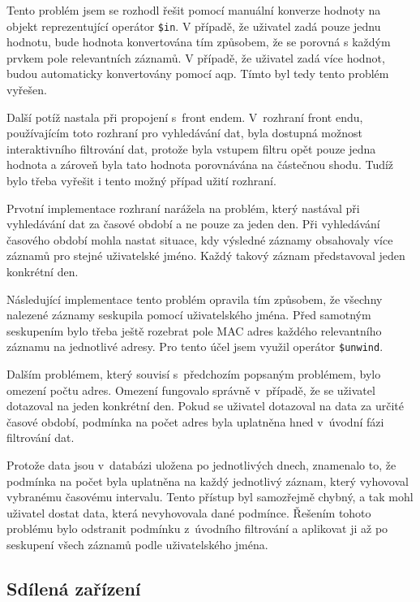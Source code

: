 \documentclass[thesis=M,czech]{FITthesis}[2012/06/26]
\begin{document}
      Tento problém jsem se rozhodl řešit
      pomocí manuální konverze hodnoty na objekt reprezentující operátor \verb|$in|.
      V případě, že uživatel zadá pouze jednu hodnotu, 
      bude hodnota konvertována tím způsobem, že se porovná s každým prvkem pole relevantních záznamů.
      V případě, že uživatel zadá více hodnot, budou automaticky konvertovány pomocí aqp.
      Tímto byl tedy tento problém vyřešen.
      
      Další potíž nastala při propojení s~front endem.
      V~rozhraní front endu, používajícím toto rozhraní pro vyhledávání dat,
      byla dostupná možnost interaktivního filtrování dat,
      protože byla vstupem filtru opět pouze jedna hodnota a 
      zároveň byla tato hodnota porovnávána na částečnou shodu.
      Tudíž bylo třeba vyřešit i tento možný případ užití rozhraní.

      Prvotní implementace rozhraní narážela na problém, 
      který nastával při vyhledávání dat za časové období a ne pouze za jeden den.
      Při vyhledávání časového období mohla nastat situace, 
      kdy výsledné záznamy obsahovaly více záznamů pro stejné uživatelské jméno.
      Každý takový záznam představoval jeden konkrétní den.

      Následující implementace tento problém opravila tím způsobem,
      že všechny nalezené záznamy seskupila pomocí uživatelského jména.
      Před samotným seskupením bylo třeba ještě rozebrat pole MAC adres každého
      relevantního záznamu na jednotlivé adresy. 
      Pro tento účel jsem využil operátor \verb|$unwind|.

      Dalším problémem, který souvisí s~předchozím popsaným problémem, bylo
      omezení počtu adres.
      Omezení fungovalo správně v~případě, že se uživatel dotazoval
      na jeden konkrétní den.
      Pokud se uživatel dotazoval na data za určité časové období,
      podmínka na počet adres byla uplatněna hned v~úvodní fázi filtrování dat.

      Protože data jsou v~databázi uložena po jednotlivých dnech,
      znamenalo to, že podmínka na počet byla uplatněna na každý jednotlivý záznam,
      který vyhovoval vybranému časovému intervalu.
      Tento přístup byl samozřejmě chybný, a tak mohl uživatel dostat data, která nevyhovovala
      dané podmínce.
      Řešením tohoto problému bylo odstranit podmínku z~úvodního filtrování
      a aplikovat ji až po seskupení všech záznamů podle uživatelského jména.

    \subsection{Sdílená zařízení}
    
\end{document}
